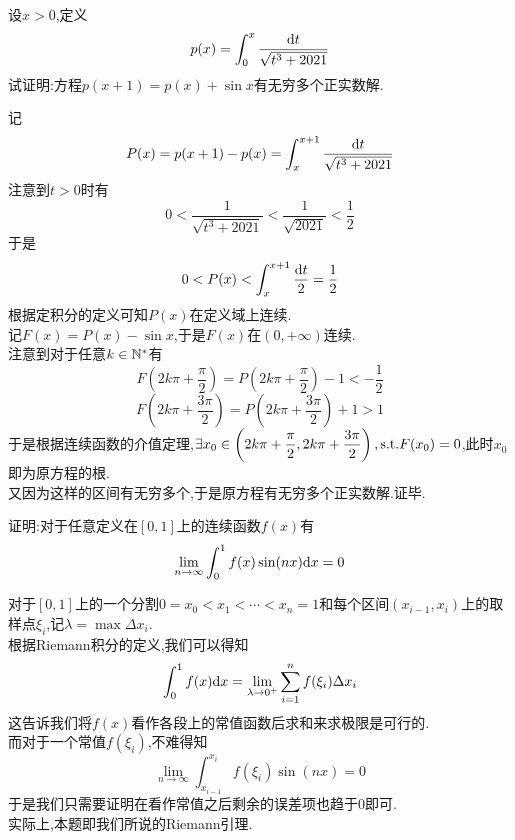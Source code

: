 \documentclass{ctexart}
\begin{document}
\begin{problem}[4.(20\songti{分})]
    设$x>0$,定义$$p(x)=\int_0^x\dfrac{\mathrm{d} t}{\sqrt{t^3+2021}}$$
    试证明:方程$p(x+1)=p(x)+\sin x$有无穷多个正实数解.
\end{problem}
\begin{solution}[Proof.]
    记$$P(x)=p(x+1)-p(x)=\int_x^{x+1}\dfrac{\mathrm{d} t}{\sqrt{t^3+2021}}$$
    注意到$t>0$时有$$0<\dfrac{1}{\sqrt{t^3+2021}}<\dfrac{1}{\sqrt{2021}}<\dfrac{1}{2}$$
    于是$$0<P(x)<\int_x^{x+1}\dfrac{\mathrm{d} t}{2}=\dfrac{1}{2}$$
    根据定积分的定义可知$P(x)$在定义域上连续.\\
    记$F(x)=P(x)-\sin x$,于是$F(x)$在$(0,+\infty)$连续.\\
    注意到对于任意$k\in\mathbb{N}^*$有
    $$F\left(2k\pi+\dfrac{\pi}{2}\right)=P\left(2k\pi+\dfrac{\pi}{2}\right)-1<-\dfrac{1}{2}$$
    $$F\left(2k\pi+\dfrac{3\pi}{2}\right)=P\left(2k\pi+\dfrac{3\pi}{2}\right)+1>1$$
    于是根据连续函数的介值定理,$\exists x_0\in\left(2k\pi+\dfrac{\pi}{2},2k\pi+\dfrac{3\pi}{2}\right),\text{s.t.} F(x_0)=0$,此时$x_0$即为原方程的根.\\
    又因为这样的区间有无穷多个,于是原方程有无穷多个正实数解.证毕.
\end{solution}
\begin{problem}[5.(15\songti{分})]
    证明:对于任意定义在$[0,1]$上的连续函数$f(x)$有$$\lim_{n\to\infty}\int_0^1f(x)\sin(nx)\mathrm{d} x=0$$
\end{problem}
\begin{analyze}[Analysis]
    对于$[0,1]$上的一个分割$0=x_0<x_1<\cdots<x_n=1$和每个区间$(x_{i-1},x_{i})$上的取样点$\xi_i$,记$\lambda=\max\Delta x_i$.\\
    根据Riemann积分的定义,我们可以得知
    $$\int_0^1f(x)\mathrm{d} x=\lim_{\lambda\to0^+}\sum_{i=1}^{n}f(\xi_i)\Delta x_i$$
    这告诉我们将$f(x)$看作各段上的常值函数后求和来求极限是可行的.\\
    而对于一个常值$f(\xi_i)$,不难得知$$\lim_{n\to\infty}\int_{x_{i-1}}^{x_i}f(\xi_i)\sin(nx)=0$$
    于是我们只需要证明在看作常值之后剩余的误差项也趋于$0$即可.\\
    实际上,本题即我们所说的Riemann引理.
\end{analyze}
\end{document}
